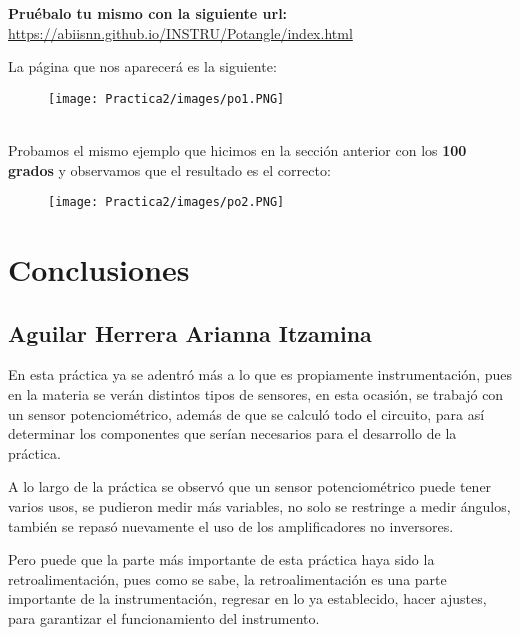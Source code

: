 \documentclass[12pt]{article}
\begin{document}
    \textbf{Pruébalo tu mismo con la siguiente url:} \\
    \url{https://abiisnn.github.io/INSTRU/Potangle/index.html}
    
    La página que nos aparecerá es la siguiente:
        \begin{figure}[h!]
                \centering
                \texttt{[image: Practica2/images/po1.PNG]}
    \end{figure}
    \\        
    Probamos el mismo ejemplo que hicimos en la sección anterior con los \textbf{100 grados} y observamos que el resultado es el correcto:
    
        \begin{figure}[h!]
                \centering
                \texttt{[image: Practica2/images/po2.PNG]}
            \end{figure}
    
    


	\newpage
	\section{Conclusiones}
		\subsection{Aguilar Herrera Arianna Itzamina}
    En esta práctica ya se adentró más a lo que es propiamente instrumentación, pues en la materia se verán distintos tipos de sensores, en esta ocasión, se trabajó con un sensor potenciométrico, además de que se calculó todo el circuito, para así determinar los componentes que serían necesarios para el desarrollo de la práctica. 
    
    A lo largo de la práctica se observó que un sensor potenciométrico puede tener varios usos, se pudieron medir más variables, no solo se restringe a medir ángulos, también se repasó nuevamente el uso de los amplificadores no inversores.
    
    Pero puede que la parte más importante de esta práctica haya sido la retroalimentación, pues como se sabe, la retroalimentación es una parte importante de la instrumentación, regresar en lo ya establecido, hacer ajustes, para garantizar el funcionamiento del instrumento. 
    
\end{document}
